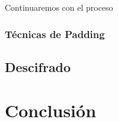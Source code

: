 \documentclass[10pt]{article}
\begin{document}
      Continuaremos con el proceso 

   \subsubsection*{Técnicas de Padding}
   \subsection{Descifrado}


\section{Conclusión}


 
 
\end{document}
